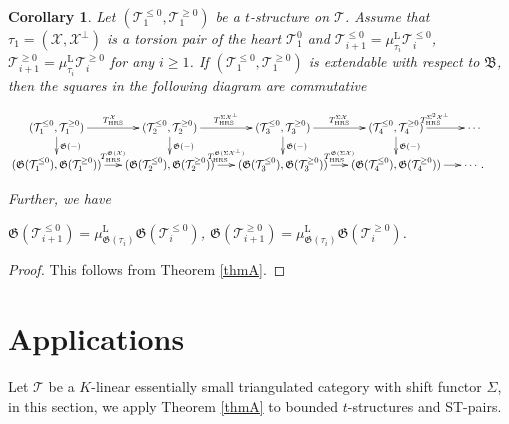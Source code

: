 \documentclass[11pt,a4paper]{amsart}
\numberwithin{equation}{section} \theoremstyle{plain}
\newtheorem{cor}[lem]{Corollary}
\numberwithin{equation}{section} \theoremstyle{definition}
\begin{document}
\begin{cor} Let $(\mathcal{T}_{1}^{\leq0},\mathcal{T}_{1}^{\geq0})$ be a $t$-structure on $\mathcal{T}$. Assume that $\tau_{1}=(\mathcal{X},\mathcal{X}^{\perp})$ is a torsion pair of the heart $\mathcal{T}_{1}^{0}$ and $\mathcal{T}_{i+1}^{\leq0}=\mu^{\mathrm{L}}_{\tau_{i}}\mathcal{T}_{i}^{\leq0}$, $\mathcal{T}_{i+1}^{\geq0}=\mu^{\mathrm{L}}_{\tau_{i}}\mathcal{T}_{i}^{\geq0}$ for any $i\geq1$. If $(\mathcal{T}_{1}^{\leq0},\mathcal{T}_{1}^{\geq0})$ is extendable with respect to $\mathfrak{B}$, then the squares in the following diagram are commutative
\begin{center} $\xymatrix@C=15pt@R=15pt{
(\mathcal{T}_{1}^{\leq0},\mathcal{T}_{1}^{\geq0})\ar[d]^{\mathfrak{G}(-)}\ar[r]^{T_{\mathrm{HRS}}^{\mathcal{X}}} &
(\mathcal{T}_{2}^{\leq0},\mathcal{T}_{2}^{\geq0})\ar[d]^{\mathfrak{G}(-)}\ar[r]^{T_{\mathrm{HRS}}^{\Sigma\mathcal{X}^{\perp}}}& (\mathcal{T}_{3}^{\leq0},\mathcal{T}_{3}^{\geq0})\ar[d]^{\mathfrak{G}(-)}\ar[r]^{T_{\mathrm{HRS}}^{\Sigma\mathcal{X}}}& (\mathcal{T}_{4}^{\leq0},\mathcal{T}_{4}^{\geq0})\ar[d]^{\mathfrak{G}(-)}\ar[r]^{T_{\mathrm{HRS}}^{\Sigma^{2}\mathcal{X}^{\perp}}}& \cdots \\
(\mathfrak{G}(\mathcal{T}_{1}^{\leq0}),\mathfrak{G}(\mathcal{T}_{1}^{\geq0}))\ar[r]^{T_{\mathrm{HRS}}^{\mathfrak{G}(\mathcal{X})}}& (\mathfrak{G}(\mathcal{T}_{2}^{\leq0}),\mathfrak{G}(\mathcal{T}_{2}^{\geq0}))\ar[r]^{T_{\mathrm{HRS}}^{\mathfrak{G}(\Sigma\mathcal{X}^{\perp})}}& (\mathfrak{G}(\mathcal{T}_{3}^{\leq0}),\mathfrak{G}(\mathcal{T}_{3}^{\geq0}))\ar[r]^{T_{\mathrm{HRS}}^{\mathfrak{G}(\Sigma\mathcal{X})}}& (\mathfrak{G}(\mathcal{T}_{4}^{\leq0}),\mathfrak{G}(\mathcal{T}_{4}^{\geq0}))\ar[r]^{}& \cdots .&}$
\end{center}
Further, we have \begin{center}
$\mathfrak{G}(\mathcal{T}_{i+1}^{\leq0})=\mu^{\mathrm{L}}_{\mathfrak{G}(\tau_{i})}\mathfrak{G}(\mathcal{T}_{i}^{\leq0})$,
$\mathfrak{G}(\mathcal{T}_{i+1}^{\geq0})=\mu^{\mathrm{L}}_{\mathfrak{G}(\tau_{i})}\mathfrak{G}(\mathcal{T}_{i}^{\geq0})$.
\end{center}
\end{cor}
\begin{proof} This follows from Theorem \ref{thmA}.
\end{proof}

\bigskip
\section{\bf Applications}
Let $\mathcal{T}$ be a $K$-linear essentially small triangulated category with shift functor $\Sigma$, in this section, we apply Theorem \ref{thmA} to bounded $t$-structures and ST-pairs.
\end{document}
